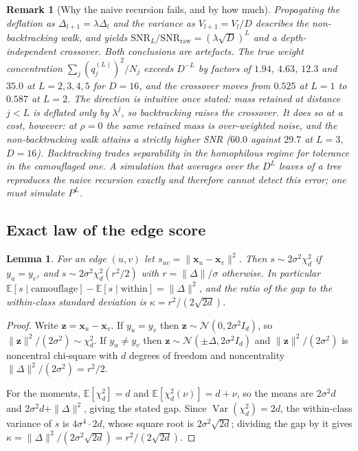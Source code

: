\documentclass[onecolumn,pdflatex,sn-basic,Numbered]{sn-jnl}
\theoremstyle{thmstyleone}
\newtheorem{lemma}[theorem]{Lemma}
\theoremstyle{thmstylethree}
\newtheorem{remark}[theorem]{Remark}
\begin{document}
\begin{appendices}
\begin{remark}[Why the naive recursion fails, and by how much]
Propagating the deflation as $\Delta_{l+1} = \lambda\Delta_l$ and the variance as
$V_{l+1} = V_l/D$ describes the \emph{non-backtracking} walk, and yields
$\mathrm{SNR}_L/\mathrm{SNR}_{\mathrm{raw}} = (\lambda\sqrt D)^L$ and a
depth-independent crossover. Both conclusions are artefacts. The true weight
concentration $\sum_j (q^{(L)}_j)^2/N_j$ exceeds $D^{-L}$ by factors of $1.94$,
$4.63$, $12.3$ and $35.0$ at $L = 2,3,4,5$ for $D = 16$, and the crossover moves from
$0.525$ at $L=1$ to $0.587$ at $L=2$. The direction is intuitive once stated: mass retained at distance $j<L$ is deflated
only by $\lambda^{j}$, so backtracking raises the crossover. It does so at a cost,
however: at $\rho=0$ the same retained mass is over-weighted noise, and the
non-backtracking walk attains a strictly higher SNR ($60.0$ against $29.7$ at $L=3$,
$D=16$). Backtracking trades separability in the homophilous regime for tolerance in
the camouflaged one. A
simulation that averages over the $D^L$ leaves of a tree reproduces the naive
recursion exactly and therefore cannot detect this error; one must simulate $P^L$.
\end{remark}

\subsection{Exact law of the edge score}
\label{app:score}

\begin{lemma}
For an edge $(u,v)$ let $s_{uv} = \|\mathbf{x}_u - \mathbf{x}_v\|^2$. Then
$s \sim 2\sigma^2\chi^2_d$ if $y_u = y_v$, and
$s \sim 2\sigma^2\chi^2_d(r^2/2)$ with $r = \|\Delta\|/\sigma$ otherwise. In
particular $\mathbb{E}[s \mid \text{camouflage}] - \mathbb{E}[s \mid \text{within}]
= \|\Delta\|^2$, and the ratio of the gap to the within-class standard deviation is
$\kappa = r^2/(2\sqrt{2d})$.
\end{lemma}

\begin{proof}
Write $\mathbf{z} = \mathbf{x}_u - \mathbf{x}_v$. If $y_u = y_v$ then
$\mathbf{z} \sim \mathcal{N}(0, 2\sigma^2 I_d)$, so
$\|\mathbf{z}\|^2/(2\sigma^2) \sim \chi^2_d$. If $y_u \neq y_v$ then
$\mathbf{z} \sim \mathcal{N}(\pm\Delta, 2\sigma^2 I_d)$ and
$\|\mathbf{z}\|^2/(2\sigma^2)$ is noncentral chi-square with $d$ degrees of freedom
and noncentrality $\|\Delta\|^2/(2\sigma^2) = r^2/2$.

For the moments, $\mathbb{E}[\chi^2_d] = d$ and
$\mathbb{E}[\chi^2_d(\nu)] = d + \nu$, so the means are $2\sigma^2 d$ and
$2\sigma^2 d + \|\Delta\|^2$, giving the stated gap. Since
$\operatorname{Var}(\chi^2_d) = 2d$, the within-class variance of $s$ is
$4\sigma^4\cdot 2d$, whose square root is $2\sigma^2\sqrt{2d}$; dividing the gap by
it gives $\kappa = \|\Delta\|^2/(2\sigma^2\sqrt{2d}) = r^2/(2\sqrt{2d})$.


\end{proof}
\end{appendices}
\end{document}
